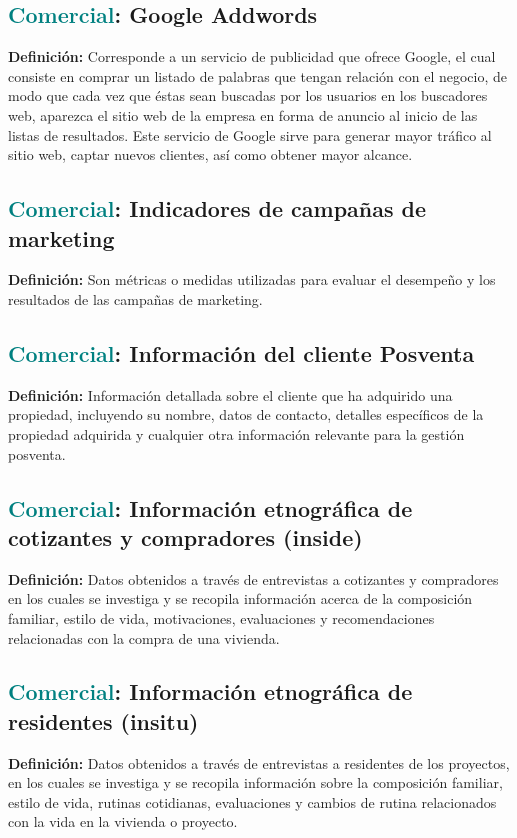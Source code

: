 \documentclass[12pt]{article}
\begin{document}
\subsection{\textcolor{teal}{Comercial}: Google Addwords}
\textbf{Definición:} Corresponde a un servicio de publicidad que ofrece Google, el cual consiste en comprar un listado de palabras que tengan relación con el negocio, de modo que cada vez que éstas sean buscadas por los usuarios en los buscadores web, aparezca el sitio web de la empresa en forma de anuncio al inicio de las listas de resultados. Este servicio de Google sirve para generar mayor tráfico al sitio web, captar nuevos clientes, así como obtener mayor alcance.
\subsection{\textcolor{teal}{Comercial}: Indicadores de campañas de marketing}
\textbf{Definición:} Son métricas o medidas utilizadas para evaluar el desempeño y los resultados de las campañas de marketing.
\subsection{\textcolor{teal}{Comercial}: Información del cliente Posventa}
\textbf{Definición:} Información detallada sobre el cliente que ha adquirido una propiedad, incluyendo su nombre, datos de contacto, detalles específicos de la propiedad adquirida y cualquier otra información relevante para la gestión posventa.
\subsection{\textcolor{teal}{Comercial}: Información etnográfica de cotizantes y compradores (inside)}
\textbf{Definición:} Datos obtenidos a través de entrevistas a cotizantes y compradores en los cuales se investiga y se recopila información acerca de la composición familiar, estilo de vida, motivaciones, evaluaciones y recomendaciones relacionadas con la compra de una vivienda.
\subsection{\textcolor{teal}{Comercial}: Información etnográfica de residentes (insitu)}
\textbf{Definición:} Datos obtenidos a través de entrevistas a residentes de los proyectos, en los cuales se investiga y se recopila información sobre la composición familiar, estilo de vida, rutinas cotidianas, evaluaciones y cambios de rutina relacionados con la vida en la vivienda o proyecto.
\end{document}
